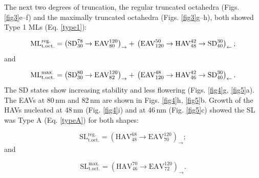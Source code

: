 \documentclass[review,authoryear]{elsarticle}
\newcommand{\nm}{\,\text{nm}}
\begin{document}
The next two degrees of truncation, the regular truncated octahedra (Figs. \ref{fig3}e--f) and the maximally truncated octahedra (Figs. \ref{fig3}g--h), both showed Type 1 MLs (Eq. \ref{type1}):
{\par\nobreak\noindent}
\begin{equation}
\text{ML}_{\text{t.oct.}}^{\text{reg.}}=\left(\text{SD}_{30}^{78}\rightarrow\text{EAV}_{80}^{120}\right)_{\rightarrow} + \\
\left(\text{EAV}_{120}^{50}\rightarrow\text{HAV}_{48}^{42}\rightarrow\text{SD}_{40}^{30}\right)_{\leftarrow};
\end{equation}
and
{\par\nobreak\noindent}
\begin{equation}
\text{ML}_{\text{t.oct.}}^{\text{max.}}=\left(\text{SD}_{30}^{80}\rightarrow\text{EAV}_{82}^{120}\right)_{\rightarrow} + \\
\left(\text{EAV}_{120}^{48}\rightarrow\text{HAV}_{46}^{42}\rightarrow\text{SD}_{40}^{30}\right)_{\leftarrow}.
\end{equation}
The SD states show increasing stability and less flowering (Figs. \ref{fig4}g, \ref{fig5}a). The EAVs at 80$\nm$ and 82$\nm$ are shown in Figs. \ref{fig4}h, \ref{fig5}b. Growth of the HAVs nucleated at 48$\nm$ (Fig. \ref{fig4}i) and at 46$\nm$ (Fig. \ref{fig5}c) showed the SL was Type A (Eq. \ref{typeA}) for both shapes:
{\par\nobreak\noindent}
\begin{equation}
\text{SL}_{\text{t.oct.}}^{\text{reg.}}=\left(\text{HAV}_{48}^{68}\rightarrow\text{EAV}_{70}^{120}\right)_{\rightarrow};
\end{equation}
and
{\par\nobreak\noindent}
\begin{equation}
\text{SL}_{\text{t.oct.}}^{\text{max.}}=\left(\text{HAV}_{46}^{70}\rightarrow\text{EAV}_{72}^{120}\right)_{\rightarrow}.
\end{equation}
\par
\end{document}

